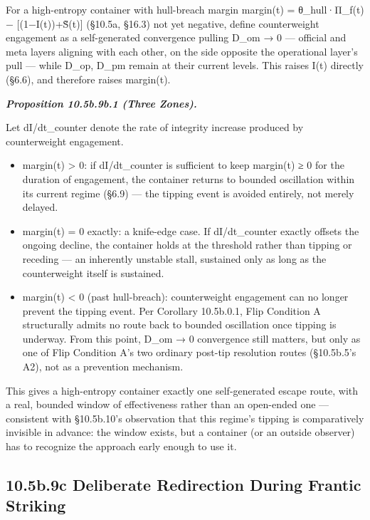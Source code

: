 \documentclass[
]{article}
\begin{document}
For a high-entropy container with hull-breach margin margin(t) =
θ\_hull·Π\_f(t) − {[}(1−I(t))+S̃(t){]} (§10.5a, §16.3) not yet negative,
define counterweight engagement as a self-generated convergence pulling
D\_om → 0 --- official and meta layers aligning with each other, on the
side opposite the operational layer's pull --- while D\_op, D\_pm remain
at their current levels. This raises I(t) directly (§6.6), and therefore
raises margin(t).

\emph{\textbf{Proposition 10.5b.9b.1 (Three Zones).}}

Let dI/dt\_counter denote the rate of integrity increase produced by
counterweight engagement.

\begin{itemize}
\item
  margin(t) \textgreater{} 0: if dI/dt\_counter is sufficient to keep
  margin(t) ≥ 0 for the duration of engagement, the container returns to
  bounded oscillation within its current regime (§6.9) --- the tipping
  event is avoided entirely, not merely delayed.
\item
  margin(t) = 0 exactly: a knife-edge case. If dI/dt\_counter exactly
  offsets the ongoing decline, the container holds at the threshold
  rather than tipping or receding --- an inherently unstable stall,
  sustained only as long as the counterweight itself is sustained.
\item
  margin(t) \textless{} 0 (past hull-breach): counterweight engagement
  can no longer prevent the tipping event. Per Corollary 10.5b.0.1, Flip
  Condition A structurally admits no route back to bounded oscillation
  once tipping is underway. From this point, D\_om → 0 convergence still
  matters, but only as one of Flip Condition A's two ordinary post-tip
  resolution routes (§10.5b.5's A2), not as a prevention mechanism.
\end{itemize}

This gives a high-entropy container exactly one self-generated escape
route, with a real, bounded window of effectiveness rather than an
open-ended one --- consistent with §10.5b.10's observation that this
regime's tipping is comparatively invisible in advance: the window
exists, but a container (or an outside observer) has to recognize the
approach early enough to use it.

\hypertarget{b.9c-deliberate-redirection-during-frantic-striking}{%
\subsection{10.5b.9c Deliberate Redirection During Frantic
Striking}\label{b.9c-deliberate-redirection-during-frantic-striking}}
\end{document}

